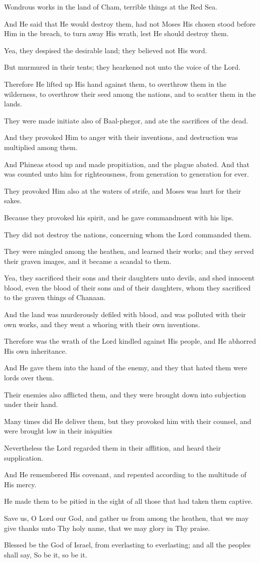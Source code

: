 Wondrous works in the land of Cham, terrible things at the Red Sea.

And He said that He would destroy them, had not Moses His chosen stood before Him in the breach, to turn away His wrath, lest He should destroy them.

Yea, they despised the desirable land; they believed not His
word.

But murmured in their tents; they hearkened not unto the voice of the Lord.

Therefore He lifted up His hand against them, to overthrow them in the wilderness, to overthrow their seed among the nations, and to scatter them in the lands.

They were made initiate also of Baal-phegor, and ate the sacrifices of the dead.

And they provoked Him to anger with their inventions, and destruction was multiplied among them.

And Phineas stood up and made propitiation, and the plague abated. And that was counted unto him for righteousness, from generation to generation for ever.

They provoked Him also at the waters of strife, and Moses was hurt for their sakes.

Because they provoked his spirit, and he gave commandment with his lips.

They did not destroy the nations, concerning whom the Lord commanded them.

They were mingled among the heathen, and learned their works; and they served their graven images, and it became a scandal to them.

Yea, they sacrificed their sons and their daughters unto devils, and shed innocent blood, even the blood of their sons and of their daughters, whom they sacrificed to the graven things of Chanaan.

And the land was murderously defiled with blood, and was polluted with their own works, and they went a whoring with their own inventions.

Therefore was the wrath of the Lord kindled against His people, and He abhorred His own inheritance.

And He gave them into the hand of the enemy, and they that hated them were lords over them.

Their enemies also afflicted them, and they were brought down into subjection under their hand.

Many times did He deliver them, but they provoked him with their counsel, and were brought low in their iniquities

Nevertheless the Lord regarded them in their afflition, and heard their supplication.

And He remembered His covenant, and repented according to the multitude of His mercy.

He made them to be pitied in the sight of all those that had taken them captive.

Save us, O Lord our God, and gather us from among the heathen, that we may give thanks unto Thy holy name, that we may glory in Thy praise.

Blessed be the God of Israel, from everlasting to everlasting; and all the peoples shall say, So be it, so be it.
